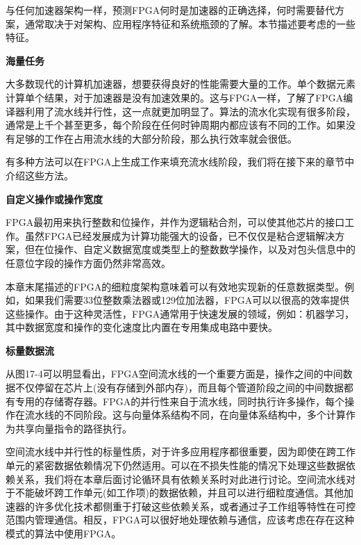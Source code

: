 与任何加速器架构一样，预测FPGA何时是加速器的正确选择，何时需要替代方案，通常取决于对架构、应用程序特征和系统瓶颈的了解。本节描述要考虑的一些特征。\par

\hspace*{\fill} \par %
\textbf{海量任务}

大多数现代的计算机加速器，想要获得良好的性能需要大量的工作。单个数据元素计算单个结果，对于加速器是没有加速效果的。这与FPGA一样，了解了FPGA编译器利用了流水线并行性，这一点就更加明显了。算法的流水化实现有很多阶段，通常是上千个甚至更多，每个阶段在任何时钟周期内都应该有不同的工作。如果没有足够的工作在占用流水线的大部分阶段，那么执行效率就会很低。\par

有多种方法可以在FPGA上生成工作来填充流水线阶段，我们将在接下来的章节中介绍这些方法。\par

\hspace*{\fill} \par %
\textbf{自定义操作或操作宽度}

FPGA最初用来执行整数和位操作，并作为逻辑粘合剂，可以使其他芯片的接口工作。虽然FPGA已经发展成为计算功能强大的设备，已不仅仅是粘合逻辑解决方案，但在位操作、自定义数据宽度或类型上的整数数学操作，以及对包头信息中的任意位字段的操作方面仍然非常高效。\par

本章末尾描述的FPGA的细粒度架构意味着可以有效地实现新的任意数据类型。例如，如果我们需要33位整数乘法器或129位加法器，FPGA可以以很高的效率提供这些操作。由于这种灵活性，FPGA通常用于快速发展的领域，例如：机器学习，其中数据宽度和操作的变化速度比内置在专用集成电路中要快。\par

\hspace*{\fill} \par %
\textbf{标量数据流}

从图17-4可以明显看出，FPGA空间流水线的一个重要方面是，操作之间的中间数据不仅停留在芯片上(没有存储到外部内存)，而且每个管道阶段之间的中间数据都有专用的存储寄存器。FPGA的并行性来自于流水线，同时执行许多操作，每个操作在流水线的不同阶段。这与向量体系结构不同，在向量体系结构中，多个计算作为共享向量指令的路径执行。\par

空间流水线中并行性的标量性质，对于许多应用程序都很重要，因为即使在跨工作单元的紧密数据依赖情况下仍然适用。可以在不损失性能的情况下处理这些数据依赖关系，我们将在本章后面讨论循环具有依赖关系时对此进行讨论。空间流水线对于不能破坏跨工作单元(如工作项)的数据依赖，并且可以进行细粒度通信。其他加速器的许多优化技术都侧重于打破这些依赖关系，或者通过子工作组等特性在可控范围内管理通信。相反，FPGA可以很好地处理依赖与通信，应该考虑在存在这种模式的算法中使用FPGA。\par

